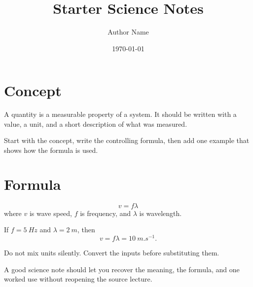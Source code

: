 \documentclass{otscience}
\title{\textbf{Starter Science Notes}}
\author{Author Name}
\date{\today}
\begin{document}
\maketitle
\tableofcontents
\newpage

\section{Concept}

\begin{definitionbox}[Quantity]
  A quantity is a measurable property of a system. It should be written with a
  value, a unit, and a short description of what was measured.
\end{definitionbox}

\begin{intuitionbox}
  Start with the concept, write the controlling formula, then add one example
  that shows how the formula is used.
\end{intuitionbox}

\section{Formula}

\begin{formulabox}
  \[
    v=f\lambda
  \]
  where \(v\) is wave speed, \(f\) is frequency, and \( \lambda \) is wavelength.
\end{formulabox}

\begin{examplebox}
  If \(f=\SI{5}{Hz}\) and \(\lambda=\SI{2}{m}\), then
  \[
    v=f\lambda=\SI{10}{m.s^{-1}}.
  \]
\end{examplebox}

\begin{warningbox}
  Do not mix units silently. Convert the inputs before substituting them.
\end{warningbox}

\begin{summarybox}[Takeaway]
  A good science note should let you recover the meaning, the formula, and one
  worked use without reopening the source lecture.
\end{summarybox}
\end{document}
